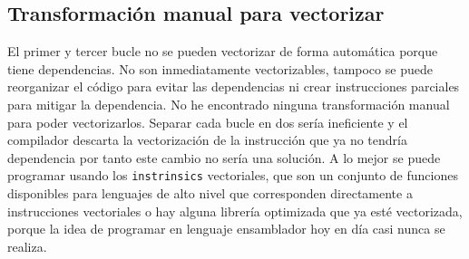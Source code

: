 \subsection{Transformación manual para vectorizar}


\newpage


\par El primer y tercer bucle no se pueden vectorizar de forma automática porque tiene dependencias. No son inmediatamente
vectorizables, tampoco se puede reorganizar el código para evitar las dependencias ni crear instrucciones parciales para mitigar la
dependencia. No he encontrado ninguna transformación manual para poder vectorizarlos. Separar cada bucle en dos sería
ineficiente y el compilador descarta la vectorización de la instrucción que ya no tendría dependencia por tanto este cambio no
sería una solución. A lo mejor se puede programar usando los \texttt{instrinsics} vectoriales, que son un conjunto de funciones
disponibles para lenguajes de alto nivel que corresponden directamente a instrucciones vectoriales o hay alguna librería
optimizada que ya esté vectorizada, porque la idea de programar en lenguaje ensamblador hoy en día casi nunca se realiza.